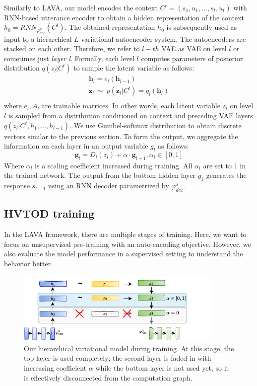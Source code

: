 Similarly to LAVA, our model encodes the context $C^t = (s_1,u_1,...,s_t,u_t)$ with RNN-based utterance encoder to obtain a hidden representation of the context $h_0 = RNN_{\varphi_{enc}^u} (C^t)$.
The obtained representation $h_0$ is subsequently used as input to a hierarchical $L$ variational autoencoder system.
The autoencoders are stacked on each other.
Therefore, we refer to $l-th$ VAE as VAE on level $l$ or sometimes just \emph{layer l}.
Formally, each level $l$ computes parameters of posterior distribution $q(z_l|C^t)$ to sample the latent variable as follows:
\begin{equation}
\begin{split}    
    \mathbf{h}_l = e_l(\mathbf{h}_{l-1}) \\
    \mathbf{z}_l~\mathtt{\sim}~p(\mathbf{z}_l|C^t) = q_l(\mathbf{h}_l) \\
\end{split}
\end{equation}
where $e_l, A_l$ are trainable matrices.
In other words, each latent variable $z_l$ on level $l$ is sampled from a  distribution conditioned on context and preceding VAE layers $q(z_l|C^t,h_1,...,h_{l-1})$.
We use Gumbel-softmax distribution to obtain discrete vectors similar to the previous section.
To form the output, we aggregate the information on each layer in an output variable $g_l$ as follows:
\begin{equation}
\mathbf{g}_l = D_l(z_l) + \alpha \cdot \mathbf{g}_{l+1}, \alpha_l \in [0, 1]
\end{equation}
Where $\alpha_l$ is a scaling coefficient increased during training. All $\alpha_l$ are set to 1 in the trained network.
The output from the bottom hidden layer $g_1$ generates the response $s_{t+1}$  using an RNN decoder parametrized by $\varphi^s_{dec}$.

\subsection{HVTOD training}
In the LAVA framework, there are multiple stages of training.
Here, we want to focus on unsupervised pre-training with an auto-encoding objective.
However, we also evaluate the model performance in a supervised setting to understand the behavior better.
\begin{figure}[h]
    \centering
    \includegraphics[width=0.9\textwidth]{images/HLAVA-fadein.pdf}
    \caption{Our hierarchical variational model during training. At this stage, the top layer is used completely; the second layer is faded-in with increasing coefficient $\alpha$ while the bottom layer is not used yet, so it is effectively disconnected from the computation graph.}
    \label{05:fig:HVTOD-fadein}
\end{figure}


